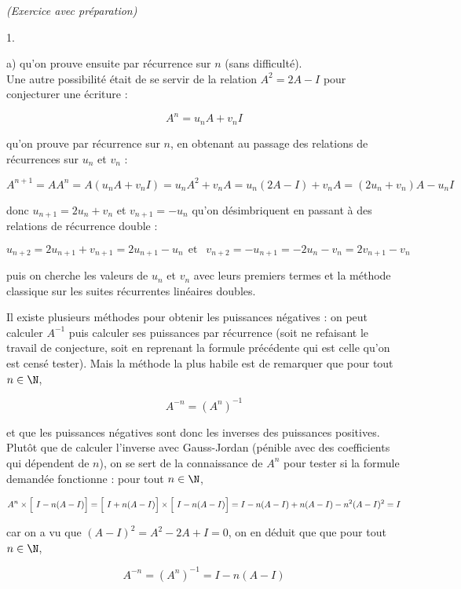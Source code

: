 \documentclass[11pt]{article}%
\begin{document}
\begin{exercice}{\it (Exercice avec préparation)}
\begin{noliste}{1.}
\begin{noliste}{a)}
 qu'on prouve ensuite par récurrence sur $n$ (sans difficulté). \\

 Une autre possibilité était de se servir de la relation $A^{2} = 2 A -
I$ pour conjecturer une écriture : 
 
\[
 A^{n} = u_{n} A + v_{n} I 
\]

 qu'on prouve par récurrence sur $n$, en obtenant au passage des
relations de récurrences sur $u_{n}$ et $v_{n}$ : 
 
\[
 A^{n + 1} = A A^{n} = A ( u_{n} A + v_{n} I ) = u_{n} A^{2} + v_{n} A
= u_{n} ( 2 A - I ) + v_{n} A = ( 2u_{n} + v_{n} ) A - u_{n} I 
\]

 donc $u_{n + 1} = 2 u_{n} + v_{n}$ et $v_{n + 1} = -u_{n}$ qu'on
désimbriquent en passant à des relations de récurrence double : 
 
\[
 u_{n + 2} = 2 u_{n + 1} + v_{n + 1} = 2 u_{n + 1} - u_{n} \ \ \text{
et } \ \ v_{n + 2} = - u_{n + 1} = - 2 u_{n} - v_{n} = 2 v_{n + 1} -
v_{n} 
\]

 puis on cherche les valeurs de $u_{n}$ et $v_{n}$ avec leurs premiers
termes et la méthode classique sur les suites récurrentes linéaires
doubles. \\

 \item Il existe plusieurs méthodes pour obtenir les puissances
négatives : on peut calculer $A^{-1}$ puis calculer ses puissances par
récurrence (soit ne refaisant le travail de conjecture, soit en
reprenant la formule précédente qui est celle qu'on est censé tester).
Mais la méthode la plus habile est de remarquer que pour tout $n \in
\N$,
 
\[
 A^{ - n } = ( A^{n} )^{ - 1 } 
\]

 et que les puissances négatives sont donc les inverses des puissances
positives. Plutôt que de calculer l'inverse avec Gauss-Jordan (pénible
avec des coefficients qui dépendent de $n$), on se sert de la
connaissance de $A^{n}$ pour tester si la formule demandée fonctionne :
pour tout $n \in \N$,
 
\[
 A^{n} \times \left[ \ \rule{0cm}{0.4cm} I -n ( A - I ) \right] =
\left[ \ \rule{0cm}{0.4cm} I + n ( A - I ) \right] \times \left[ \
\rule{0cm}{0.4cm} I -n ( A - I ) \right] = I - n ( A - I ) + n ( A - I
) - n^{2} ( A - I )^{2} = I 
\]

 car on a vu que $(A-I)^{2} = A^{2} - 2 A + I = 0$, on en déduit que
que pour tout $n \in \N$, 
 
\[
 A^{-n} = ( A^{n} )^{-1} = I - n ( A - I ) 
\]


\end{noliste}
\end{noliste}
\end{exercice}
\end{document}
